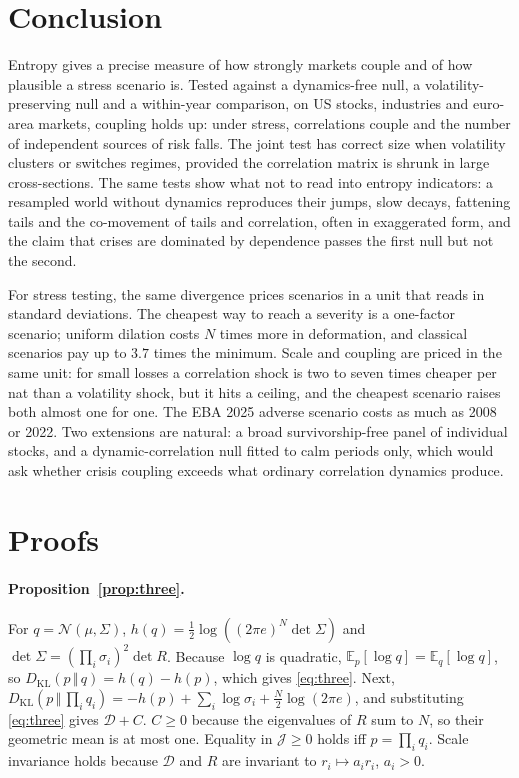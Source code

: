 \documentclass[12pt]{article}
\theoremstyle{definition}
\theoremstyle{remark}
\newcommand{\JJ}{\mathcal{J}}
\newcommand{\DD}{\mathcal{D}}
\newcommand{\KL}[2]{D_{\mathrm{KL}}\!\left(#1\,\Vert\,#2\right)}
\newcommand{\E}{\mathbb{E}}
\begin{document}
\begin{doublespace}
\section{Conclusion}
\label{sec:conclusion}

Entropy gives a precise measure of how strongly markets couple and of how
plausible a stress scenario is. Tested against a dynamics-free null, a
volatility-preserving null and a within-year comparison, on US stocks,
industries and euro-area markets, coupling holds up: under stress,
correlations couple and the number of independent sources of risk falls. The
joint test has correct size when volatility clusters or switches regimes,
provided the correlation matrix is shrunk in large cross-sections. The same
tests show what not to read into entropy indicators: a resampled world without
dynamics reproduces their jumps, slow decays, fattening tails and the
co-movement of tails and correlation, often in exaggerated form, and the claim
that crises are dominated by dependence passes the first null but not the
second.

For stress testing, the same divergence prices scenarios in a unit that reads
in standard deviations. The cheapest way to reach a severity is a one-factor
scenario; uniform dilation costs $N$ times more in deformation, and classical
scenarios pay up to $3.7$ times the minimum. Scale and coupling are priced
in the same unit: for small losses a correlation shock is two to seven times
cheaper per nat than a volatility shock, but it hits a ceiling, and the
cheapest scenario raises both almost one for one. The EBA 2025 adverse scenario
costs as much as 2008 or 2022. Two extensions are natural: a
broad survivorship-free panel of individual stocks, and a dynamic-correlation
null fitted to calm periods only, which would ask whether crisis coupling
exceeds what ordinary correlation dynamics produce.

\appendix
\section{Proofs}
\label{app:proofs}

\paragraph{Proposition~\ref{prop:three}.} For $q=\mathcal N(\mu,\Sigma)$,
$h(q)=\tfrac12\log((2\pi e)^N\det\Sigma)$ and
$\det\Sigma=(\prod_i\sigma_i)^2\det R$. Because $\log q$ is quadratic,
$\E_p[\log q]=\E_q[\log q]$, so $\KL{p}{q}=h(q)-h(p)$, which gives
\eqref{eq:three}. Next,
$\KL{p}{\prod_iq_i}=-h(p)+\sum_i\log\sigma_i+\tfrac N2\log(2\pi e)$, and
substituting \eqref{eq:three} gives $\DD+C$. $C\ge0$ because the eigenvalues of
$R$ sum to $N$, so their geometric mean is at most one. Equality in
$\JJ\ge0$ holds iff $p=\prod_iq_i$. Scale invariance holds because
$\DD$ and $R$ are invariant to $r_i\mapsto a_ir_i$, $a_i>0$.


\end{doublespace}
\end{document}
